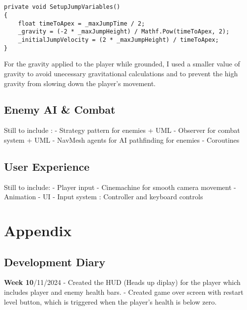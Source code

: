 \documentclass[]{final_report}
\begin{document}
\paragraph{}
\begin{verbatim}
private void SetupJumpVariables()
{
    float timeToApex = _maxJumpTime / 2;
    _gravity = (-2 * _maxJumpHeight) / Mathf.Pow(timeToApex, 2);
    _initialJumpVelocity = (2 * _maxJumpHeight) / timeToApex;
}
\end{verbatim}
For the gravity applied to the player while grounded, I used a smaller value of gravity to avoid unecessary gravitational calculations and to prevent the high gravity from slowing down the player's movement. \newline

\section{Enemy AI \& Combat}
Still to include : \newline
- Strategy pattern for enemies + UML \newline
- Observer for combat system + UML \newline
- NavMesh agents for AI pathfinding for enemies \newline
- Coroutines  \newline
\section{User Experience}
Still to include: \newline
- Player input \newline
- Cinemachine for smooth camera movement \newline
- Animation \newline
- UI \newline
- Input system : Controller and keyboard controls \newline

\appendix
\chapter{Appendix}

\section{Development Diary}
\textbf{Week 10}/11/2024
\newline- Created the HUD (Heads up diplay) for the player which includes player and enemy health bars.
\newline- Created game over screen with restart level button, which is triggered when the player's health is below zero.
 
\end{document}
